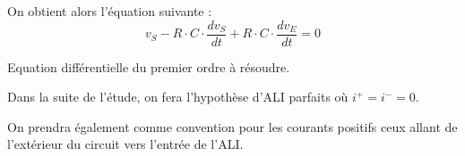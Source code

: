 \documentclass[a4paper,french]{paper}
\begin{document}
On obtient alors l'équation suivante : $$\boxed{v_S - R \cdot C \cdot \frac{dv_S}{dt} + R \cdot C \cdot \frac{dv_E}{dt} = 0}$$

Equation différentielle du premier ordre à résoudre.

\newpage

Dans la suite de l'étude, on fera l'hypothèse d'ALI parfaits où $i^+ = i^- = 0$.

On prendra également comme convention pour les courants positifs ceux allant de l'extérieur du circuit vers l'entrée de l'ALI.
\end{document}
